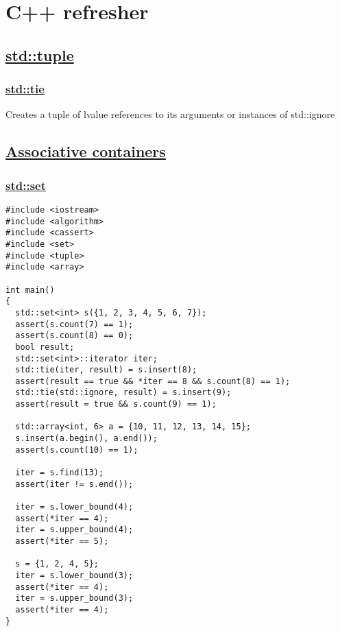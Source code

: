 \documentclass{book}
\begin{document}
	\chapter{C++ refresher}
	\section{\href{https://en.cppreference.com/w/cpp/utility/tuple}{std::tuple}}
	
	\subsection{\href{https://en.cppreference.com/w/cpp/utility/tuple/tie}{std::tie}}
	Creates a tuple of lvalue references to its arguments or instances of std::ignore
	\section{\href{https://en.wikipedia.org/wiki/Associative_array}{Associative containers}}
	\subsection{\href{https://en.cppreference.com/w/cpp/container/set}{std::set}}
	\begin{lstlisting}
#include <iostream>
#include <algorithm>
#include <cassert>
#include <set>
#include <tuple>
#include <array>

int main()
{
  std::set<int> s({1, 2, 3, 4, 5, 6, 7});
  assert(s.count(7) == 1);
  assert(s.count(8) == 0);
  bool result;
  std::set<int>::iterator iter;
  std::tie(iter, result) = s.insert(8);
  assert(result == true && *iter == 8 && s.count(8) == 1);
  std::tie(std::ignore, result) = s.insert(9);
  assert(result = true && s.count(9) == 1);

  std::array<int, 6> a = {10, 11, 12, 13, 14, 15};
  s.insert(a.begin(), a.end());
  assert(s.count(10) == 1);

  iter = s.find(13);
  assert(iter != s.end());

  iter = s.lower_bound(4);
  assert(*iter == 4);
  iter = s.upper_bound(4);
  assert(*iter == 5);

  s = {1, 2, 4, 5};
  iter = s.lower_bound(3);
  assert(*iter == 4);
  iter = s.upper_bound(3);
  assert(*iter == 4);
}
	\end{lstlisting}
\end{document}
